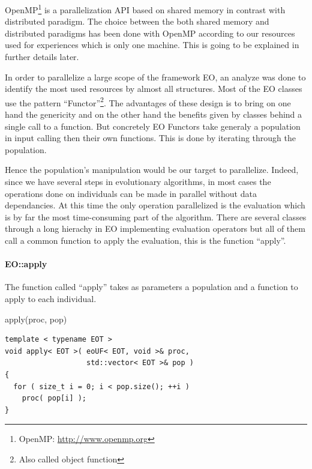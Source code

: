 \documentclass{sig-alternate}
\begin{document}
OpenMP\footnote{OpenMP: \url{http://www.openmp.org}} is a parallelization API based on shared memory in contrast with distributed paradigm. The choice between the both shared memory and distributed paradigms has been done with OpenMP according to our resources used for experiences which is only one machine. This is going to be explained in further details later.


In order to parallelize a large scope of the framework EO, an analyze was done to identify the most used resources by almost all structures. Most of the EO classes use the pattern ``Functor''\footnote{Also called object function}. The advantages of these design is to bring on one hand the genericity and on the other hand the benefits given by classes behind a single call to a function. But concretely EO Functors take generaly a population in input calling then their own functions. This is done by iterating through the population.

Hence the population's manipulation would be our target to parallelize. Indeed, since we have several steps in evolutionary algorithms, in most cases the operations done on individuals can be made in parallel without data dependancies. At this time the only operation parallelized is the evaluation which is by far the most time-consuming part of the algorithm. There are several classes through a long hierachy in EO implementing evaluation operators but all of them call a common function to apply the evaluation, this is the function ``apply''.

\paragraph{EO::apply} %
The function called ``apply'' takes as parameters a population and a function to apply to each individual.


\vspace{-0.2cm}
\begin{algorithm}[h!]
\caption{apply(proc, pop)}
\vspace{0.2cm}
\begin{verbatim}
template < typename EOT >
void apply< EOT >( eoUF< EOT, void >& proc,
                   std::vector< EOT >& pop )
{
  for ( size_t i = 0; i < pop.size(); ++i )
    proc( pop[i] );
}
\end{verbatim}
\end{algorithm}
\vspace{-0.2cm}
\end{document}
